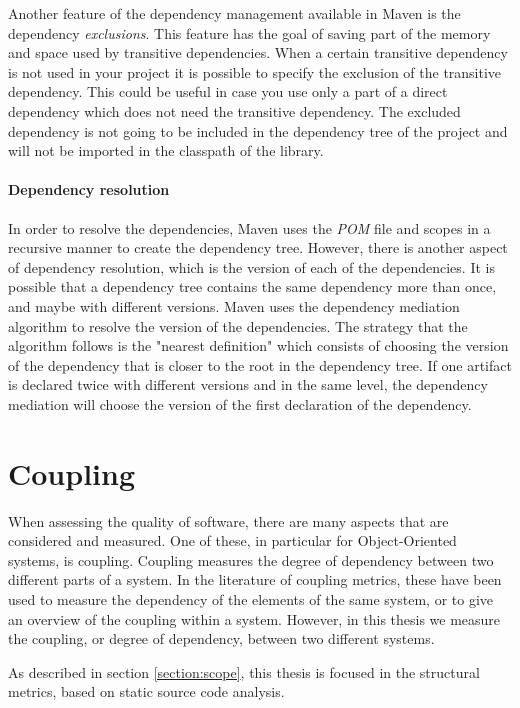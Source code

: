 Another feature of the dependency management available in Maven is the dependency \textit{exclusions}. This feature has the goal of saving part of the memory and space used by transitive dependencies. When a certain transitive dependency is not used in your project it is possible to specify the exclusion of the transitive dependency. This could be useful in case you use only a part of a direct dependency which does not need the transitive dependency. The excluded dependency is not going to be included in the dependency tree of the project and will not be imported in the classpath of the library.

\paragraph{Dependency resolution}
In order to resolve the dependencies, Maven uses the \textit{POM} file and scopes in a recursive manner to create the dependency tree. However, there is another aspect of dependency resolution, which is the version of each of the dependencies. It is possible that a dependency tree contains the same dependency more than once, and maybe with different versions. Maven uses the dependency mediation algorithm to resolve the version of the dependencies. The strategy that the algorithm follows is the "nearest definition" which consists of choosing the version of the dependency that is closer to the root in the dependency tree. If one artifact is declared twice with different versions and in the same level, the dependency mediation will choose the version of the first declaration of the dependency.

\section{Coupling}\label{section:bg-coupling}
When assessing the quality of software, there are many aspects that are considered and measured. One of these, in particular for Object-Oriented systems, is coupling. Coupling measures the degree of dependency between two different parts of a system. In the literature of coupling metrics, these have been used to measure the dependency of the elements of the same system, or to give an overview of the coupling within a system. However, in this thesis we measure the coupling, or degree of dependency, between two different systems.

As described in section \ref{section:scope}, this thesis is focused in the structural metrics, based on static source code analysis.

